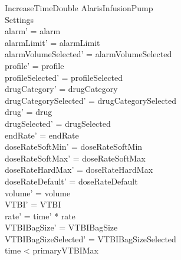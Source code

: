 \begin{schema}{IncreaseTimeDouble}
	\Delta AlarisInfusionPump\\
	 Settings\\
	\where
	alarm' = alarm\\
	alarmLimit' = alarmLimit\\
	alarmVolumeSelected' = alarmVolumeSelected\\
	profile' = profile\\
	profileSelected' = profileSelected\\
	drugCategory' = drugCategory\\ 
	drugCategorySelected' = drugCategorySelected\\
	drug' = drug\\ 
	drugSelected' = drugSelected\\
	endRate' = endRate\\
	doseRateSoftMin' = doseRateSoftMin\\
	doseRateSoftMax' = doseRateSoftMax\\
	doseRateHardMax' = doseRateHardMax\\
	doseRateDefault' = doseRateDefault\\
	\pagebreak
	volume' = volume\\
	VTBI' = VTBI\\
	rate' = time' * rate\\
	VTBIBagSize' = VTBIBagSize\\ 
	VTBIBagSizeSelected' = VTBIBagSizeSelected\\
	time < primaryVTBIMax\\

\end{schema}
